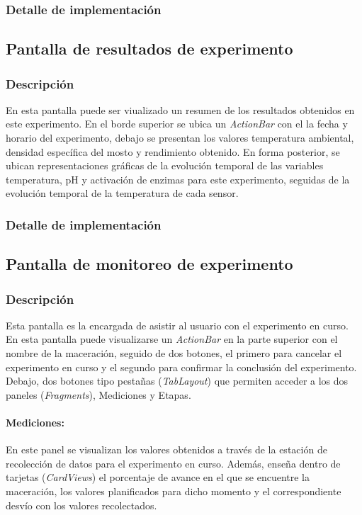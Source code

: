             \subsubsection{Detalle de implementación}
            
        \subsection{Pantalla de resultados de experimento}
            \subsubsection{Descripción}
            En esta pantalla puede ser viualizado un resumen de los resultados obtenidos en este experimento.
            En el borde superior se ubica un \textit{ActionBar} con el la fecha y horario del experimento, debajo se presentan los valores temperatura ambiental, densidad específica del mosto y rendimiento obtenido. En forma posterior, se ubican representaciones gráficas de la evolución temporal de las variables temperatura, pH y activación de enzimas para este experimento, seguidas de la evolución temporal de la temperatura de cada sensor.
            
            \subsubsection{Detalle de implementación}
            
        \subsection{Pantalla de monitoreo de experimento}
            \subsubsection{Descripción}
            Esta pantalla es la encargada de asistir al usuario con el experimento en curso.
            En esta pantalla puede visualizarse un \textit{ActionBar} en la parte superior con el nombre de la maceración, seguido de dos botones, el primero para cancelar el experimento en curso y el segundo para confirmar la conclusión del experimento. Debajo, dos botones tipo pestañas (\textit{TabLayout}) que permiten acceder a los dos paneles (\textit{Fragments}), Mediciones y Etapas.
            
            \paragraph{Mediciones:}
            En este panel se visualizan los valores obtenidos a través de la estación de recolección de datos para el experimento en curso. Además, enseña dentro de tarjetas (\textit{CardViews}) el porcentaje de avance en el que se encuentre la maceración, los valores planificados para dicho momento y el correspondiente desvío con los valores recolectados.
